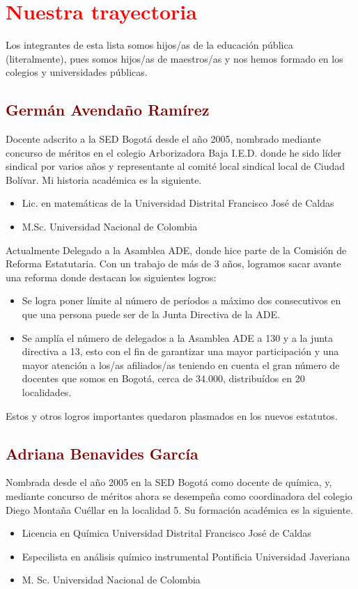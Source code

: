 \documentclass[10pt, notumble, letterpaper]{leaflet}
\begin{document}
\section{\textcolor{red}{Nuestra trayectoria}}
Los integrantes de esta lista somos hijos/as de la educación pública (literalmente), pues somos hijos/as de maestros/as y nos hemos formado en los colegios y universidades públicas. 
\subsection{\textcolor{Maroon}{Germán Avendaño Ramírez}}
Docente adscrito a la SED Bogotá desde el año 2005, nombrado mediante concurso de méritos en el colegio Arborizadora Baja I.E.D. donde he sido líder sindical por varios años y representante al comité local sindical local de Ciudad Bolívar. 
Mi historia académica es la siguiente.
\begin{itemize}
\item Lic. en matemáticas de la Universidad Distrital Francisco José de Caldas
\item M.Sc. Universidad Nacional de Colombia
\end{itemize}
Actualmente Delegado a la Asamblea ADE, donde hice parte de la Comisión de Reforma Estatutaria. Con un trabajo de más de 3 años, logramos sacar avante una reforma donde destacan los siguientes logros:
\begin{itemize}
\item Se logra poner límite al número de períodos a máximo dos consecutivos en que una persona puede ser de la Junta Directiva de la ADE.
\item Se amplía el número de delegados a la Asamblea ADE a 130 y a la junta directiva a 13, esto con el fin de garantizar una mayor participación y una mayor atención a los/as afiliados/as teniendo en cuenta el gran número de docentes que somos en Bogotá, cerca de 34.000, distribuídos en 20 localidades. 
\end{itemize}
Estos y otros logros importantes quedaron plasmados en los nuevos estatutos.

\newpage
\subsection{\textcolor{Maroon}{Adriana Benavides García}}
Nombrada desde el año 2005 en la SED Bogotá como docente de química, y, mediante concurso de méritos ahora se desempeña como coordinadora del colegio Diego Montaña Cuéllar en la localidad 5. Su formación académica es la siguiente.
\begin{itemize}
\item Licencia en Química Universidad Distrital Francisco José de Caldas
\item Especilista en análisis químico instrumental Pontificia Universidad Javeriana
\item M. Sc. Universidad Nacional de Colombia
\end{itemize}
\end{document}
